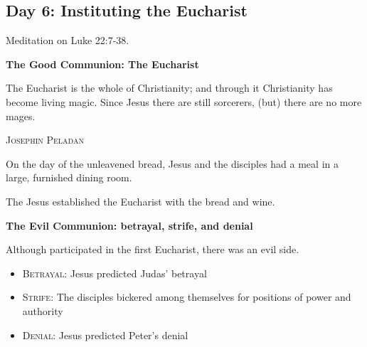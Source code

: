 \subsection*{Day 6: Instituting the Eucharist}
Meditation on Luke 22:7-38.

\textbf{The Good Communion: The Eucharist}

\begin{quotationx}
The Eucharist is the whole of Christianity; and through it Christianity has become living magic. Since Jesus there are
still sorcerers, (but) there are no more mages. \begin{flushright} \textsc{Josephin Peladan}\end{flushright}

\end{quotationx}

On the day of the unleavened bread, Jesus and the disciples had a meal in a large, furnished dining room.

The Jesus established the Eucharist with the bread and wine.

\textbf{The Evil Communion: betrayal, strife, and denial}

Although participated in the first Eucharist, there was an evil side.

\begin{itemize}
\item \textsc{Betrayal}: Jesus predicted Judas' betrayal 
\item \textsc{Strife}: The disciples bickered among themselves for positions of power and authority 
\item \textsc{Denial}: Jesus predicted Peter's denial 
\end{itemize}

